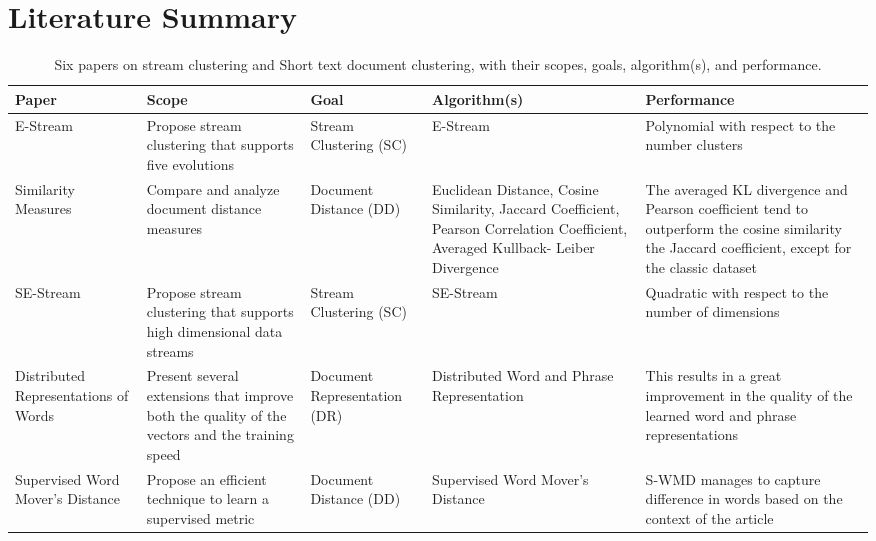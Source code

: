 \documentclass{IEEEtran}
\begin{document}
\section{Literature Summary}

\newcommand{\columnheaddisplaystyle}[1]{%
  \textbf{#1}%
}

\makeatletter
\newcommand{\labelthis}[2]{%
  \columnheaddisplaystyle{#2}%
  \immediate\write\@auxout{%
    \string\newlabel{#1}{{}{}{#2}{}}
  }%
}

\makeatletter
\begin{center}
\begin{table}[htbp]
\caption{Six papers on stream clustering and Short text document clustering, with their scopes, goals, algorithm(s), and performance.} 
\label{tbl:tab1}
\scriptsize
\begin{tabular}{|p{1.3cm}|p{1.3cm}|p{1.3cm}|p{1.35cm}|p{1.35cm}|}
\hline
\labelthis{paper}{Paper}  & \labelthis{scope}{Scope} & \labelthis{goal}{Goal} & \labelthis{algor}{Algorithm(s)} & \labelthis{perf}{Performance}\\
\hline
E-Stream \cite{EStream} &  
Propose stream clustering that supports five evolutions & Stream Clustering (SC) & E-Stream & Polynomial with respect to the number clusters  \\
\hline
Similarity Measures \cite{SimMea} & 
Compare and analyze document distance measures
& Document Distance (DD) &  
Euclidean Distance, Cosine Similarity,
Jaccard Coefficient,
Pearson Correlation Coefficient, Averaged Kullback-
Leiber Divergence
& The averaged KL divergence and Pearson coefficient tend to outperform the cosine similarity the Jaccard coefficient, except for the classic dataset \\
\hline
SE-Stream \cite{SEStream} & Propose stream clustering that supports high dimensional data streams  
& Stream Clustering (SC) & SE-Stream  
& Quadratic with respect to the number of dimensions  \\
\hline
Distributed Representations of Words \cite{Distributed} & 
Present several extensions that improve both the quality of the vectors and the training speed & Document Representation (DR) & 
Distributed Word and Phrase Representation & This results in a great improvement in the quality of the learned word and phrase representations  \\
\hline
Supervised Word Mover's Distance \cite{WMD} & Propose an efficient technique to learn a supervised metric & Document Distance (DD) & Supervised Word Mover's Distance & S-WMD manages to capture difference in words based on the context of the article \\ 
\hline
\end{tabular}
\end{table}
\end{center}
\end{document}
